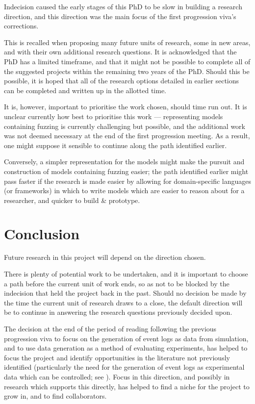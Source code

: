 \documentclass[11pt]{article}
\newcommand{\ampersand}{\&}
\begin{document}
Indecision caused the early stages of this PhD to be slow in building a research
direction, and this direction was the main focus of the first progression viva's
corrections.

This is recalled when proposing many future units of research, some in new
areas, and with their own additional research questions. It is acknowledged that
the PhD has a limited timeframe, and that it might not be possible to complete
all of the suggested projects within the remaining two years of the PhD. Should
this be possible, it is hoped that all of the research options detailed in
earlier sections can be completed and written up in the allotted time.

It is, however, important to prioritise the work chosen, should time run out. It
is unclear currently how best to prioritise this work --- representing models
containing fuzzing is currently challenging but possible, and the additional
work was not deemed necessary at the end of the first progression meeting. As a
result, one might suppose it sensible to continue along the path identified
earlier.

Conversely, a simpler representation for the models might make the pursuit and
construction of models containing fuzzing easier; the path identified earlier
might pass faster if the research is made easier by allowing for domain-specific
languages (or frameworks) in which to write models which are easier to reason
about for a researcher, and quicker to build \ampersand{} prototype.


\part{Conclusion}
Future research in this project will depend on the direction chosen. 

There is plenty of potential work to be undertaken, and it is important to
choose a path before the current unit of work ends, so as not to be blocked by
the indecision that held the project back in the past. Should no decision be
made by the time the current unit of research draws to a close, the default
direction will be to continue in answering the research questions previously
decided upon.

The decision at the end of the period of reading following the previous
progression viva to focus on the generation of event logs as data from
simulation, and to use data generation as a method of evaluating experiments,
has helped to focus the project and identify opportunities in the literature not
previously identified (particularly the need for the generation of event logs as
experimental data which can be controlled; see
\cite{secsy,on_bp_variant_generation,aalst_generating_logs}). Focus in this
direction, and possibly in research which supports this directly, has helped to
find a niche for the project to grow in, and to find collaborators.
\end{document}
